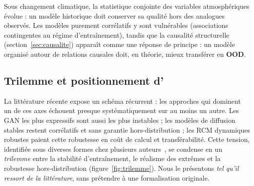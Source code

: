 Sous changement climatique, la statistique conjointe des variables atmosphériques évolue : un modèle historique doit conserver sa qualité hors des analogues observés. Les modèles purement corrélatifs y sont vulnérables (associations contingentes au régime d'entraînement), tandis que la causalité structurelle (section~\ref{sec:causalite}) apparaît comme une réponse de principe : un modèle organisé autour de relations causales doit, en théorie, mieux transférer en \textbf{OOD}.

\subsection{Trilemme et positionnement d'\Oracle{}}
\label{ssec:trilemme}

La littérature récente expose un schéma récurrent : les approches qui dominent un de ces axes échouent presque systématiquement sur au moins un autre. Les GAN les plus expressifs sont aussi les plus instables ; les modèles de diffusion stables restent corrélatifs et sans garantie hors-distribution ; les RCM dynamiques robustes paient cette robustesse en coût de calcul et transférabilité. Cette tension, identifiée sous diverses formes chez plusieurs auteurs~\cite{rampal_cgan_2024,mardani_corrdiff_2023,harris_2022}, se condense en un \emph{trilemme} entre la stabilité d'entraînement, le réalisme des extrêmes et la robustesse hors-distribution (figure~\ref{fig:trilemme}). Nous le présentons \emph{tel qu'il ressort de la littérature}, sans prétendre à une formalisation originale.

